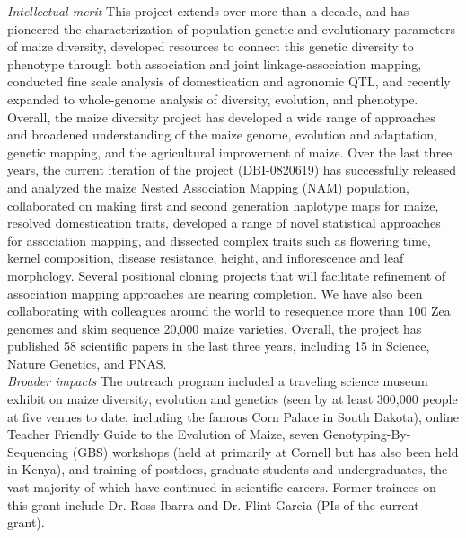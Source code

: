 \emph{Intellectual merit} This project extends over more than a decade, and has pioneered the characterization of population genetic and evolutionary parameters of maize diversity, developed resources to connect this genetic diversity to phenotype through both association and joint linkage-association mapping, conducted fine scale analysis of domestication and agronomic QTL, and recently expanded to whole-genome analysis of diversity, evolution, and phenotype. Overall, the maize diversity project has developed a wide range of approaches and broadened understanding of the maize genome, evolution and adaptation, genetic mapping, and the agricultural improvement of maize. Over the last three years, the current iteration of the project (DBI-0820619) has successfully released and analyzed the maize Nested Association Mapping (NAM) population, collaborated on making first and second generation haplotype maps for maize, resolved domestication traits, developed a range of novel statistical approaches for association mapping, and dissected complex traits such as flowering time, kernel composition, disease resistance, height, and inflorescence and leaf morphology. Several positional cloning projects that will facilitate refinement of association mapping approaches are nearing completion.  We have also been collaborating with colleagues around the world to resequence more than 100 Zea genomes and skim sequence 20,000 maize varieties. Overall, the project has published 58 scientific papers in the last three years, including 15 in Science, Nature Genetics, and PNAS. \\
\emph{Broader impacts} The outreach program included a traveling science museum exhibit on maize diversity, evolution and genetics (seen by at least 300,000 people at five venues to date, including the famous Corn Palace in South Dakota), online Teacher Friendly Guide to the Evolution of Maize, seven Genotyping-By-Sequencing (GBS) workshops (held at primarily at Cornell but has also been held in Kenya), and training of postdocs, graduate students and undergraduates, the vast majority of which have continued in scientific careers.  Former trainees on this grant include Dr. Ross-Ibarra and Dr. Flint-Garcia (PIs of the current grant).  

